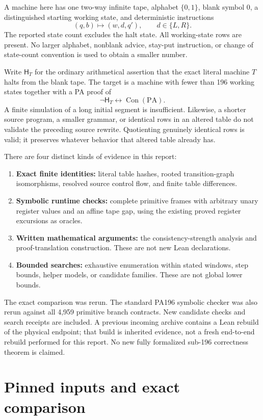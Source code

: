 \documentclass[11pt,a4paper]{article}
\newcommand{\PA}{\mathrm{PA}}
\newcommand{\Con}{\operatorname{Con}}
\newcommand{\HH}{\mathsf{H}}
\begin{document}
A machine here has one two-way infinite tape, alphabet $\{0,1\}$, blank symbol 0, a distinguished starting working state, and deterministic instructions
\[
(q,b)\longmapsto(w,d,q'),\qquad d\in\{L,R\}.
\]
The reported state count excludes the halt state. All working-state rows are present. No larger alphabet, nonblank advice, stay-put instruction, or change of state-count convention is used to obtain a smaller number.

Write $\HH_T$ for the ordinary arithmetical assertion that the exact literal machine $T$ halts from the blank tape. The target is a machine with fewer than 196 working states together with a PA proof of
\[
\neg\HH_T\leftrightarrow\Con(\PA).
\]
A finite simulation of a long initial segment is insufficient. Likewise, a shorter source program, a smaller grammar, or identical rows in an altered table do not validate the preceding source rewrite. Quotienting genuinely identical rows is valid; it preserves whatever behavior that altered table already has.

There are four distinct kinds of evidence in this report:
\begin{enumerate}
\item \textbf{Exact finite identities:} literal table hashes, rooted transition-graph isomorphisms, resolved source control flow, and finite table differences.
\item \textbf{Symbolic runtime checks:} complete primitive frames with arbitrary unary register values and an affine tape gap, using the existing proved register excursions as oracles.
\item \textbf{Written mathematical arguments:} the consistency-strength analysis and proof-translation construction. These are not new Lean declarations.
\item \textbf{Bounded searches:} exhaustive enumeration within stated windows, step bounds, helper models, or candidate families. These are not global lower bounds.
\end{enumerate}

The exact comparison was rerun. The standard PA196 symbolic checker was also rerun against all 4,959 primitive branch contracts. New candidate checks and search receipts are included. A previous incoming archive contains a Lean rebuild of the physical endpoint; that build is inherited evidence, not a fresh end-to-end rebuild performed for this report. No new fully formalized sub-196 correctness theorem is claimed.

\section{Pinned inputs and exact comparison}
\end{document}
